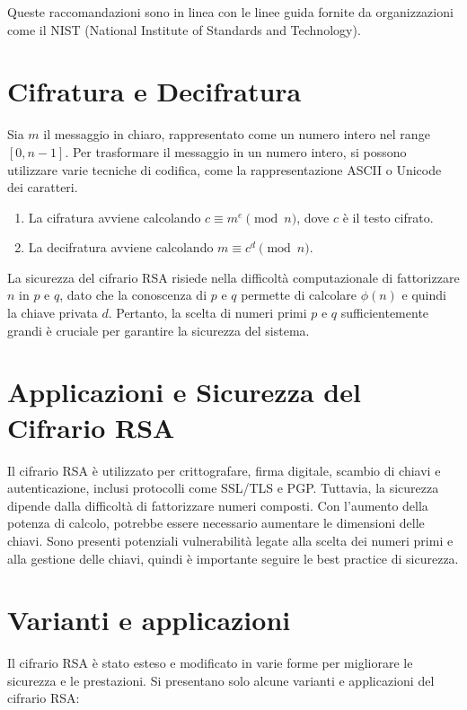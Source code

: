 \documentclass[a4paper,12pt]{report}
\begin{document}
Queste raccomandazioni sono in linea con le linee guida fornite da organizzazioni come il NIST (National Institute of Standards and Technology)\cite{nist}.

\section{Cifratura e Decifratura}
Sia $m$ il messaggio in chiaro, rappresentato come un numero intero nel range $[0, n - 1]$. Per trasformare il messaggio in un numero intero, si possono utilizzare varie tecniche di codifica, come la rappresentazione ASCII o Unicode dei caratteri.

\begin{enumerate}
    \item La cifratura avviene calcolando $c \equiv m^e \pmod{n}$, dove $c$ è il testo cifrato.
    \item La decifratura avviene calcolando $m \equiv c^d \pmod{n}$.
\end{enumerate}

La sicurezza del cifrario RSA risiede nella difficoltà computazionale di fattorizzare $n$ in $p$ e $q$, dato che la conoscenza di $p$ e $q$ permette di calcolare $\phi(n)$ e quindi la chiave privata $d$. Pertanto, la scelta di numeri primi $p$ e $q$ sufficientemente grandi è cruciale per garantire la sicurezza del sistema.

\section{Applicazioni e Sicurezza del Cifrario RSA}

Il cifrario RSA è utilizzato per crittografare, firma digitale, scambio di chiavi e autenticazione, inclusi protocolli come SSL/TLS e PGP. Tuttavia, la sicurezza dipende dalla difficoltà di fattorizzare numeri composti. Con l'aumento della potenza di calcolo, potrebbe essere necessario aumentare le dimensioni delle chiavi. Sono presenti potenziali vulnerabilità legate alla scelta dei numeri primi e alla gestione delle chiavi, quindi è importante seguire le best practice di sicurezza.

\section{Varianti e applicazioni}
Il cifrario RSA è stato esteso e modificato in varie forme per migliorare le sicurezza e le prestazioni. Si presentano solo alcune varianti e applicazioni del cifrario RSA:
\end{document}
